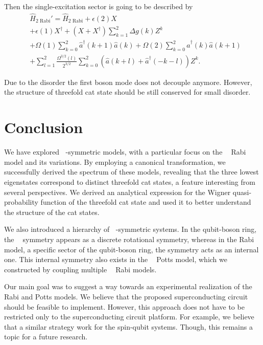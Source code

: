 \documentclass[reprint, aps, prx, amsmath, amssymb, longbibliography, superscriptaddress]{revtex4-2}
\DeclareMathOperator{\Zthree}{\mathbb{Z}_3}
\begin{document}
Then the single-excitation sector is going to be described by
\begin{equation}
\begin{aligned}
    &\hat H_{\text{2 Rabi}}' = \hat H_{\text{2 Rabi}} + \epsilon(2) X \\
    &+\epsilon(1)  X^{\dagger} + (X + X^{\dagger}) \sum\limits_{k=1}^2 \Delta g(k) Z^k\\
    &+ \Omega(1) \sum\limits_{k=0}^2 \hat a^{\dagger}(k+1) \hat a(k) + \Omega(2) \sum\limits_{k=0}^2 \hat a^{\dagger}(k) \hat a(k+1) \\
    &+ \sum\limits_{l=1}^2 \frac{\Omega^{3/2}(l)}{2^{3/2}} \sum\limits_{k=0}^2 (\hat a(k+l) + \hat a^{\dagger}(-k-l)) Z^k.
\end{aligned}
\end{equation}

Due to the disorder the first boson mode does not decouple anymore. However, the structure of threefold cat state should be still conserved for small disorder. 


\section{Conclusion}

We have explored $\Zthree$-symmetric models, with a particular focus on the $\Zthree$ Rabi model and its variations. By employing a canonical transformation, we successfully derived the spectrum of these models, revealing that the three lowest eigenstates correspond to distinct threefold cat states, a feature interesting from several perspectives. We derived an analytical expression for the Wigner quasi-probability function of the threefold cat state and used it to better understand the structure of the cat states.

We also introduced a hierarchy of $\Zthree$-symmetric systems. In the qubit-boson ring, the $\Zthree$ symmetry appears as a discrete rotational symmetry, whereas in the Rabi model, a specific sector of the qubit-boson ring, the symmetry acts as an internal one. This internal symmetry also exists in the $\Zthree$ Potts model, which we constructed by coupling multiple $\Zthree$ Rabi models.

Our main goal was to suggest a way towards an experimental realization of the $\Zthree$ Rabi and Potts models. We believe that the proposed superconducting circuit should be feasible to implement. However, this approach does not have to be restricted only to the superconducting circuit platform. For example, we believe that a similar strategy work for the spin-qubit systems. Though, this remains a topic for a future research.
\end{document}
